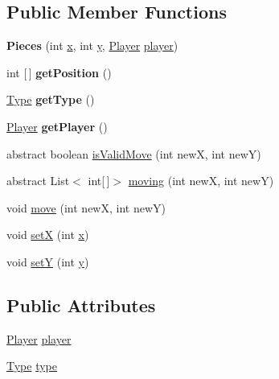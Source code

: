 \subsection*{Public Member Functions}
\begin{DoxyCompactItemize}
\item 
\mbox{\label{classpieces_1_1_pieces_a591cca84e6cf37ac52f1aff44d00764e}} 
{\bfseries Pieces} (int \mbox{\hyperlink{classpieces_1_1_pieces_ac5178f9b8a6b0c4235851475081249f3}{x}}, int \mbox{\hyperlink{classpieces_1_1_pieces_a66d911734967a8ced1b9792fe900fadb}{y}}, \mbox{\hyperlink{classgame_1_1_player}{Player}} \mbox{\hyperlink{classpieces_1_1_pieces_a49f35044dd36e5c4b04261a8ea54ad0c}{player}})
\item 
\mbox{\label{classpieces_1_1_pieces_aad794f16bdefb770c3bba9a8036929cf}} 
int \mbox{[}$\,$\mbox{]} {\bfseries get\+Position} ()
\item 
\mbox{\label{classpieces_1_1_pieces_a18d54763d5b7f5dd2e42cd1883819fa4}} 
\mbox{\hyperlink{enumpieces_1_1_type}{Type}} {\bfseries get\+Type} ()
\item 
\mbox{\label{classpieces_1_1_pieces_a077a98722aa3641b983f7c74c1377739}} 
\mbox{\hyperlink{classgame_1_1_player}{Player}} {\bfseries get\+Player} ()
\item 
abstract boolean \mbox{\hyperlink{classpieces_1_1_pieces_a4bdbd9bc2aa556e230e71a0cf756228f}{is\+Valid\+Move}} (int newX, int newY)
\item 
abstract List$<$ int\mbox{[}$\,$\mbox{]}$>$ \mbox{\hyperlink{classpieces_1_1_pieces_a28711472a94edf18be7c8300cf0cc64b}{moving}} (int newX, int newY)
\item 
void \mbox{\hyperlink{classpieces_1_1_pieces_aa204ec32ed62d79896561f253caf663a}{move}} (int newX, int newY)
\item 
void \mbox{\hyperlink{classpieces_1_1_pieces_ab54853b850ad823a067bdab91b907b86}{setX}} (int \mbox{\hyperlink{classpieces_1_1_pieces_ac5178f9b8a6b0c4235851475081249f3}{x}})
\item 
void \mbox{\hyperlink{classpieces_1_1_pieces_aefa2d9a29060faacd79e4e58d2c63196}{setY}} (int \mbox{\hyperlink{classpieces_1_1_pieces_a66d911734967a8ced1b9792fe900fadb}{y}})
\end{DoxyCompactItemize}
\subsection*{Public Attributes}
\begin{DoxyCompactItemize}
\item 
\mbox{\hyperlink{classgame_1_1_player}{Player}} \mbox{\hyperlink{classpieces_1_1_pieces_a49f35044dd36e5c4b04261a8ea54ad0c}{player}}
\item 
\mbox{\hyperlink{enumpieces_1_1_type}{Type}} \mbox{\hyperlink{classpieces_1_1_pieces_a74572cdf2d798e339c56827050259767}{type}}
\end{DoxyCompactItemize}

